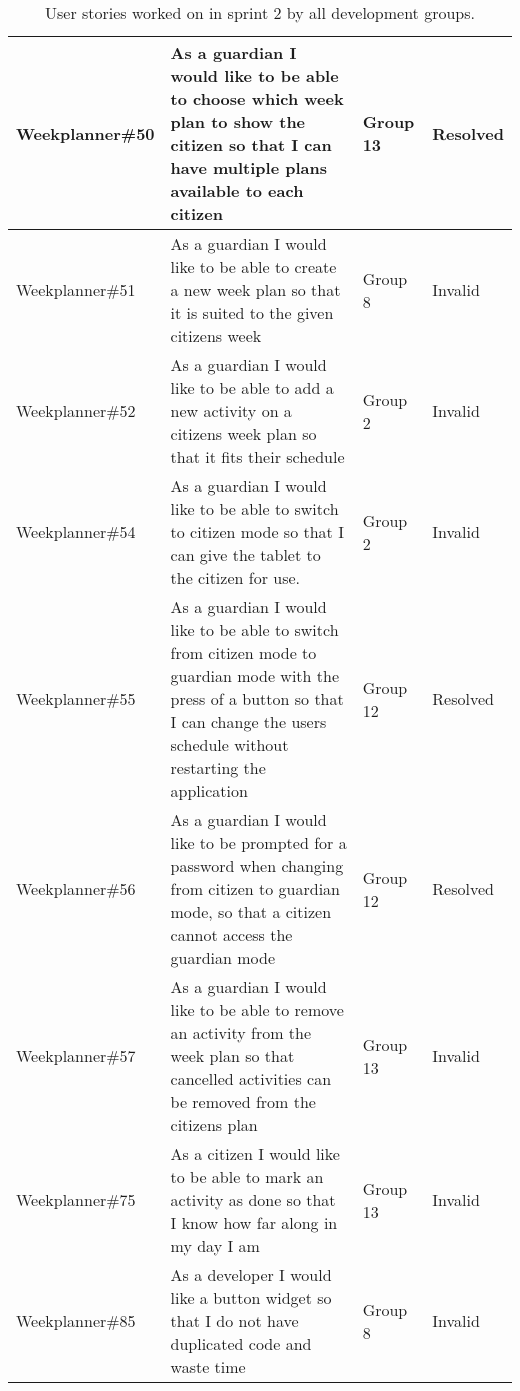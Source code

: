 \begin{table}[!ht]
\begin{tabular}{|p{2.8cm}|p{7cm}|p{1.5cm}|p{1.4cm}|}
    Weekplanner\#50 & As a guardian I would like to be able to choose which week plan to show the citizen so that I can have multiple plans available to each citizen                                          & Group 13        & Resolved\\ \hline
    Weekplanner\#51 & As a guardian I would like to be able to create a new week plan so that it is suited to the given citizens week                                                                          & Group 8         & Invalid    \\ \hline
    Weekplanner\#52 & As a guardian I would like to be able to add a new activity on a citizens week plan so that it fits their schedule                                                                       & Group 2         & Invalid    \\ \hline
    Weekplanner\#54 & As a guardian I would like to be able to switch to citizen mode so that I can give the tablet to the citizen for use.                                                                    & Group 2         & Invalid    \\ \hline
    Weekplanner\#55 & As a guardian I would like to be able to switch from citizen mode to guardian mode with the press of a button so that I can change the users schedule without restarting the application & Group 12        & Resolved    \\ \hline
    Weekplanner\#56 & As a guardian I would like to be prompted for a password when changing from citizen to guardian mode, so that a citizen cannot access the guardian mode                                  & Group 12        & Resolved    \\ \hline
    Weekplanner\#57 & As a guardian I would like to be able to remove an activity from the week plan so that cancelled activities can be removed from the citizens plan                                        & Group 13        & Invalid    \\ \hline
    Weekplanner\#75 & As a citizen I would like to be able to mark an activity as done so that I know how far along in my day I am                                                                             & Group 13        & Invalid    \\ \hline
    Weekplanner\#85 & As a developer I would like a button widget so that I do not have duplicated code and waste time                                                                                         & Group 8         & Invalid    \\ \hline
    \end{tabular}
    \caption{User stories worked on in sprint 2 by all development groups.}
\end{table}

